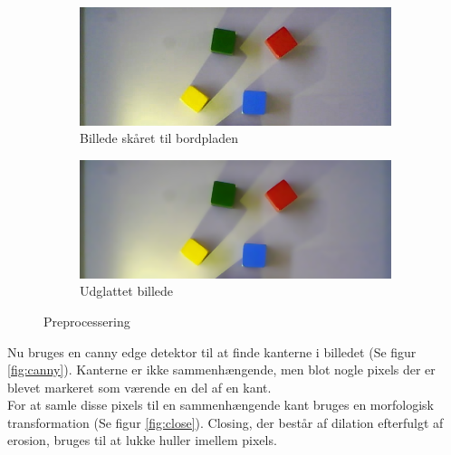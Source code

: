 \begin{figure}[H]
	\centering
	\begin{subfigure}{.45\textwidth}
		\centering
		\includegraphics[scale=0.3]{images/cropped}
		\caption{Billede skåret til bordpladen}
		\label{fig:cropped}
	\end{subfigure}
	\begin{subfigure}{.45\textwidth}
		\centering
		\includegraphics[scale=0.3]{images/smooth}
		\caption{Udglattet billede}
		\label{fig:smooth}
	\end{subfigure}
	\caption{Preprocessering}
	\label{fig:preprocessing}
\end{figure}


Nu bruges en canny edge detektor til at finde kanterne i billedet (Se figur \ref{fig:canny}).
Kanterne er ikke sammenhængende, men blot nogle pixels der er blevet markeret som værende en del af en kant. \\

For at samle disse pixels til en sammenhængende kant bruges en morfologisk transformation (Se figur \ref{fig:close}).
Closing, der består af dilation efterfulgt af erosion, bruges til at lukke huller imellem pixels. \\

